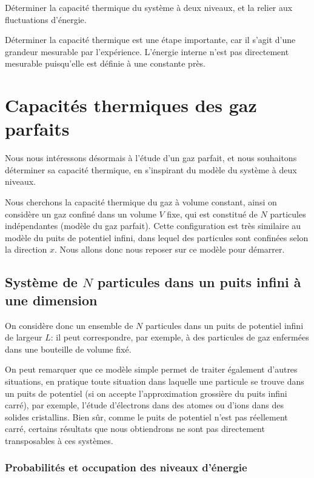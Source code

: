 \documentclass[11pt,fleqn]{book} %
\begin{document}
\begin{capex}
	Déterminer la capacité thermique du système à deux niveaux, et la relier aux fluctuations d'énergie.
\end{capex}

\begin{remark}
	Déterminer la capacité thermique est une étape importante, car il s'agit d'une grandeur mesurable par l'expérience. L'énergie interne n'est pas directement mesurable puisqu'elle est définie à une constante près.
\end{remark}


\section{Capacités thermiques des gaz parfaits}

Nous nous intéressons désormais à l'étude d'un gaz parfait, et nous souhaitons déterminer sa capacité thermique, en s'inspirant du modèle du système à deux niveaux.

Nous cherchons la capacité thermique du gaz à volume constant, ainsi on considère un gaz confiné dans un volume $V$ fixe, qui est constitué de $N$ particules indépendantes (modèle du gaz parfait). Cette configuration est très similaire au modèle du puits de potentiel infini, dans lequel des particules sont confinées selon la direction $x$. Nous allons donc nous reposer sur ce modèle pour démarrer.

\subsection{Système de $N$ particules dans un puits infini à une dimension}


On considère donc un ensemble de $N$ particules dans un puits de potentiel infini de largeur $L$: il peut correspondre, par exemple, à des particules de gaz enfermées dans une bouteille de volume fixé.

On peut remarquer que ce modèle simple permet de traiter également d'autres situations, en pratique toute situation dans laquelle une particule se trouve dans un puits de potentiel (si on accepte l'approximation grossière du puits infini carré), par exemple, l'étude d'électrons dans des atomes ou d'ions dans des solides cristallins. Bien sûr, comme le puits de potentiel n'est pas réellement carré, certains résultats que nous obtiendrons ne sont pas directement transposables à ces systèmes. 

\subsubsection{Probabilités et occupation des niveaux d'énergie}
\end{document}
